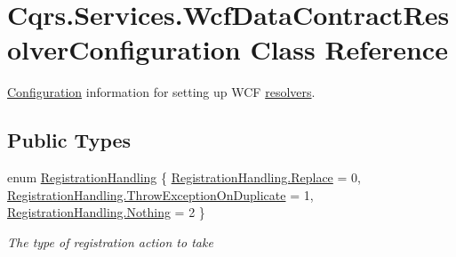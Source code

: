 \hypertarget{classCqrs_1_1Services_1_1WcfDataContractResolverConfiguration}{}\section{Cqrs.\+Services.\+Wcf\+Data\+Contract\+Resolver\+Configuration Class Reference}
\label{classCqrs_1_1Services_1_1WcfDataContractResolverConfiguration}


\hyperlink{namespaceCqrs_1_1Configuration}{Configuration} information for setting up W\+CF \hyperlink{}{resolvers}.  


\subsection*{Public Types}
\begin{DoxyCompactItemize}
\item 
enum \hyperlink{classCqrs_1_1Services_1_1WcfDataContractResolverConfiguration_acf6a145eb88c5d98b31a541cfb1fb152_acf6a145eb88c5d98b31a541cfb1fb152}{Registration\+Handling} \{ \hyperlink{classCqrs_1_1Services_1_1WcfDataContractResolverConfiguration_acf6a145eb88c5d98b31a541cfb1fb152_acf6a145eb88c5d98b31a541cfb1fb152a0ebe6df8a3ac338e0512acc741823fdb}{Registration\+Handling.\+Replace} = 0, 
\hyperlink{classCqrs_1_1Services_1_1WcfDataContractResolverConfiguration_acf6a145eb88c5d98b31a541cfb1fb152_acf6a145eb88c5d98b31a541cfb1fb152a912a5d95306192c4f037d9e353d2a3ca}{Registration\+Handling.\+Throw\+Exception\+On\+Duplicate} = 1, 
\hyperlink{classCqrs_1_1Services_1_1WcfDataContractResolverConfiguration_acf6a145eb88c5d98b31a541cfb1fb152_acf6a145eb88c5d98b31a541cfb1fb152af80a4ad87fee7c9fdc19b7769495fdb5}{Registration\+Handling.\+Nothing} = 2
 \}\begin{DoxyCompactList}\small\item\em The type of registration action to take \end{DoxyCompactList}
\end{DoxyCompactItemize}
